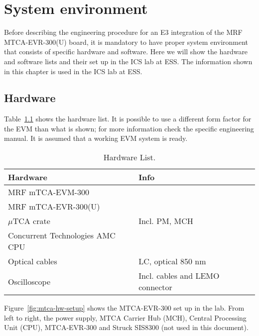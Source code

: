 \documentclass[11pt
  , a4paper
  , article
  , oneside
  , showtrims
]{memoir}
\begin{document}
\chapter{System environment}
Before describing the engineering procedure for an E3 integration of the MRF MTCA-EVR-300(U) board, it is mandatory to have proper system environment that consists of specific hardware and software. Here we will show the hardware and software lists and their set up in the ICS lab at ESS. The information shown in this chapter is used in the ICS lab at ESS.\\


\section{Hardware}
Table~\ref{table:hwlist} shows the hardware list. It is possible to use a different form factor for the EVM than what is shown; for more information check the specific engineering manual. It is assumed that a working EVM system is ready.

\begin{table}[!hb]
  \centering
  \begin{tabular}{l|l}
    \toprule
    Hardware                        & Info                            \\\midrule
    MRF mTCA-EVM-300                &                                 \\\midrule
    MRF mTCA-EVR-300(U)             &                                 \\\midrule
    $\mu$TCA crate                  & Incl. PM, MCH                   \\\midrule
    Concurrent Technologies AMC CPU &                                 \\\midrule
    Optical cables                  & LC, optical 850 nm              \\\midrule
    Oscilloscope                    & Incl. cables and LEMO connector \\\bottomrule
  \end{tabular}
  \caption[]{Hardware List.}
  \label{table:hwlist}
\end{table}

Figure~\ref{fig:mtca-hw-setup} shows the MTCA-EVR-300 set up in the lab. From left to right, the power supply, MTCA Carrier Hub (MCH), Central Processing Unit (CPU), MTCA-EVR-300 and Struck SIS8300 (not used in this document).\\
\end{document}
